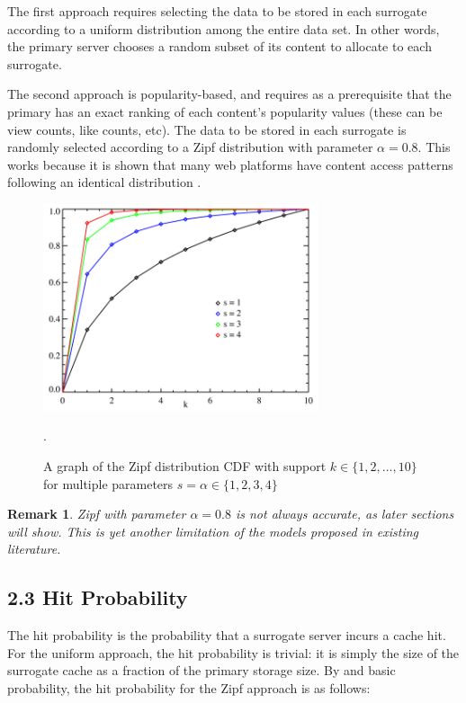 \documentclass[
	a4paper, %
	10pt, %
	unnumberedsections, %
	twoside, %
]{LTJournalArticle}
\newtheorem*{remark}{Remark}
\begin{document}
The first approach requires selecting the data to be stored in each surrogate according to a uniform distribution among the entire data set. In other words, the primary server chooses a random subset of its content to allocate to each surrogate. 

The second approach is popularity-based, and requires as a prerequisite that the primary has an exact ranking of each content's popularity values (these can be view counts, like counts, etc). The data to be stored in each surrogate is randomly selected according to a Zipf distribution with parameter $\alpha = 0.8$. This works because it is shown that many web platforms have content access patterns following an identical distribution \cite{749260}.

\begin{figure}[h]
	\begin{center}
		\includegraphics[width=8.1cm]{zipf.png}
	\end{center}
	\caption{A graph of the Zipf distribution CDF with support $k\in\{1, 2, \ldots, 10 \}$ for multiple parameters $s=\alpha \in \{1,2,3,4\}$}.
\end{figure}

\begin{remark}
    Zipf with parameter $\alpha=0.8$ is not always accurate, as later sections will show. This is yet another limitation of the models proposed in existing literature.
\end{remark}

\subsection{2.3  Hit Probability}

The hit probability is the probability that a surrogate server incurs a cache hit. For the uniform approach, the hit probability is trivial: it is simply the size of the surrogate cache as a fraction of the primary storage size. By \cite{749260} and basic probability, the hit probability for the Zipf approach is as follows:
\end{document}
